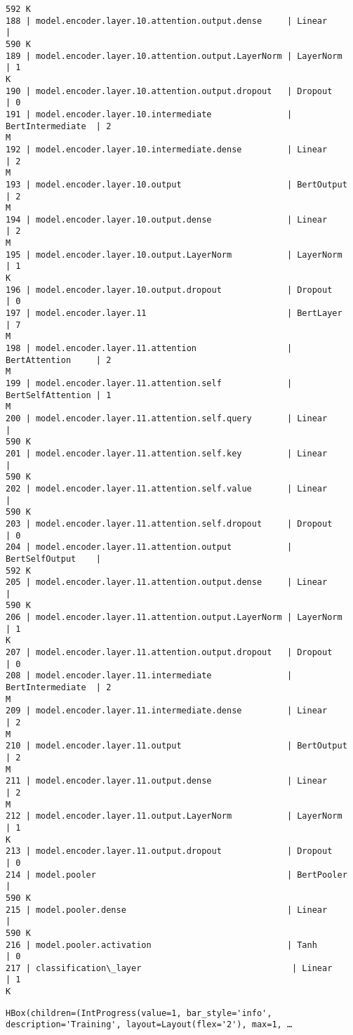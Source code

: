 \documentclass[10pt]{article}
\begin{document}
\begin{Verbatim}[commandchars=\\\{\}]
592 K
188 | model.encoder.layer.10.attention.output.dense     | Linear            |
590 K
189 | model.encoder.layer.10.attention.output.LayerNorm | LayerNorm         | 1
K
190 | model.encoder.layer.10.attention.output.dropout   | Dropout           | 0
191 | model.encoder.layer.10.intermediate               | BertIntermediate  | 2
M
192 | model.encoder.layer.10.intermediate.dense         | Linear            | 2
M
193 | model.encoder.layer.10.output                     | BertOutput        | 2
M
194 | model.encoder.layer.10.output.dense               | Linear            | 2
M
195 | model.encoder.layer.10.output.LayerNorm           | LayerNorm         | 1
K
196 | model.encoder.layer.10.output.dropout             | Dropout           | 0
197 | model.encoder.layer.11                            | BertLayer         | 7
M
198 | model.encoder.layer.11.attention                  | BertAttention     | 2
M
199 | model.encoder.layer.11.attention.self             | BertSelfAttention | 1
M
200 | model.encoder.layer.11.attention.self.query       | Linear            |
590 K
201 | model.encoder.layer.11.attention.self.key         | Linear            |
590 K
202 | model.encoder.layer.11.attention.self.value       | Linear            |
590 K
203 | model.encoder.layer.11.attention.self.dropout     | Dropout           | 0
204 | model.encoder.layer.11.attention.output           | BertSelfOutput    |
592 K
205 | model.encoder.layer.11.attention.output.dense     | Linear            |
590 K
206 | model.encoder.layer.11.attention.output.LayerNorm | LayerNorm         | 1
K
207 | model.encoder.layer.11.attention.output.dropout   | Dropout           | 0
208 | model.encoder.layer.11.intermediate               | BertIntermediate  | 2
M
209 | model.encoder.layer.11.intermediate.dense         | Linear            | 2
M
210 | model.encoder.layer.11.output                     | BertOutput        | 2
M
211 | model.encoder.layer.11.output.dense               | Linear            | 2
M
212 | model.encoder.layer.11.output.LayerNorm           | LayerNorm         | 1
K
213 | model.encoder.layer.11.output.dropout             | Dropout           | 0
214 | model.pooler                                      | BertPooler        |
590 K
215 | model.pooler.dense                                | Linear            |
590 K
216 | model.pooler.activation                           | Tanh              | 0
217 | classification\_layer                              | Linear            | 1
K
    \end{Verbatim}

    
    \begin{verbatim}
HBox(children=(IntProgress(value=1, bar_style='info', description='Training', layout=Layout(flex='2'), max=1, …
    \end{verbatim}
\end{document}
